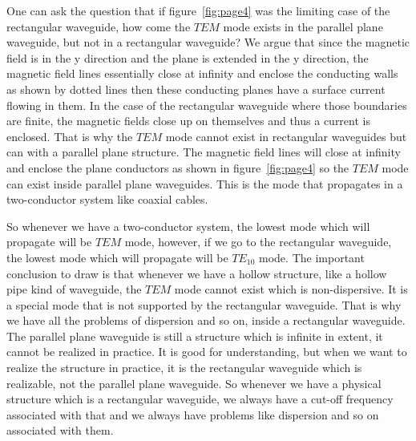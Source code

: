 One can ask the question that if figure~\ref{fig:page4} was the limiting case of the rectangular waveguide, how come the $TEM$ mode exists in the parallel plane waveguide, but not in a rectangular waveguide? We argue that since the magnetic field is in the y direction and the plane is extended in the y direction, the magnetic field lines essentially close at infinity and enclose the conducting walls as shown by dotted lines then these conducting planes have a surface current flowing in them. In the case of the rectangular waveguide where those boundaries are finite, the magnetic fields close up on themselves and thus a current is enclosed. That is why the $TEM$ mode cannot exist in rectangular waveguides but can with a parallel plane structure. The magnetic field lines will close at infinity and enclose the plane conductors as shown in figure~\ref{fig:page4} so the $TEM$ mode can exist inside parallel plane waveguides. This is the mode that propagates in a two-conductor system like coaxial cables.

So whenever we have a two-conductor system, the lowest mode which will propagate will be $TEM$ mode, however, if we go to the rectangular waveguide, the lowest mode which will propagate will be ${TE_{10}}$ mode. The important conclusion to draw is that whenever we have a hollow structure, like a hollow pipe kind of waveguide, the $TEM$ mode cannot exist which is non-dispersive. It is a special mode that is not supported by the rectangular waveguide. That is why we have all the problems of dispersion and so on, inside a rectangular waveguide. The parallel plane waveguide is still a structure which is infinite in extent, it cannot be realized in practice. It is good for understanding, but when we want to realize the structure in practice, it is the rectangular waveguide which is realizable, not the parallel plane waveguide. So whenever we have a physical structure which is a rectangular waveguide, we always have a cut-off frequency associated with that and we always have problems like dispersion and so on associated with them.

